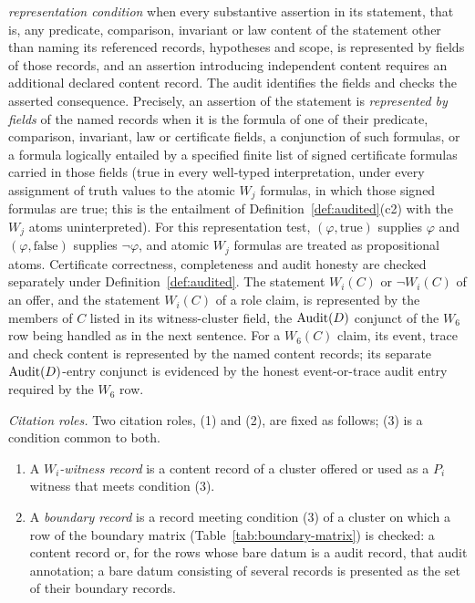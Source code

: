 \begin{definition}[Annotations]
\emph{representation condition} when every substantive assertion in its
statement, that is, any predicate, comparison, invariant or law content of the
statement other than naming its referenced records, hypotheses and scope, is
represented by fields of those records, and an assertion
introducing independent content requires an additional declared content
record. The audit identifies the fields and checks the asserted consequence.
Precisely, an assertion of the statement is \emph{represented by fields} of the
named records when it is the formula of one of their predicate, comparison,
invariant, law or certificate fields, a conjunction of such formulas, or a
formula logically entailed by a specified finite list of signed certificate
formulas carried in those fields (true in every well-typed interpretation, under every assignment of truth values to the atomic \(W_j\) formulas, in which those signed formulas are true; this is the entailment of Definition~\ref{def:audited}(c2) with the \(W_j\) atoms uninterpreted). For this representation test,
\((\varphi,\mathrm{true})\) supplies \(\varphi\) and
\((\varphi,\mathrm{false})\) supplies \(\neg\varphi\), and atomic \(W_j\)
formulas are treated as propositional atoms. Certificate correctness,
completeness and audit honesty are checked separately under
Definition~\ref{def:audited}. The statement \(W_i(C)\) or \(\neg W_i(C)\) of an
offer, and the statement \(W_i(C)\) of a role claim, is represented by the
members of \(C\) listed in its witness-cluster field, the \(\operatorname{Audit}\!\left(D\right)\) conjunct
of the \(W_6\) row being handled as in the next sentence.
For a \(W_6(C)\) claim, its event, trace and check content is represented by
the named content records; its separate \(\operatorname{Audit}\!\left(D\right)\)-entry conjunct is
evidenced by the honest event-or-trace audit entry required by the \(W_6\)
row.
\par\emph{Citation roles.} Two citation roles, (1) and (2), are fixed as follows; (3) is a condition common to both.
\begin{enumerate}[label=(\arabic*),topsep=2pt,itemsep=1pt]
  \item A \emph{\(W_i\)-witness record} is a content record of a cluster offered or used as a \(P_i\) witness that meets condition (3).
  \item A \emph{boundary record} is a record meeting condition (3) of a cluster on which a row of the boundary matrix (Table~\ref{tab:boundary-matrix}) is checked: a content record or, for the rows whose bare datum is a \Psix{} audit record, that audit annotation; a bare datum consisting of several records is presented as the set of their boundary records.

\end{enumerate}
\end{definition}
